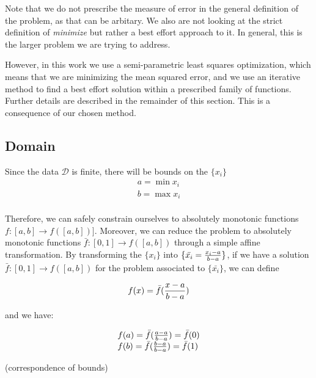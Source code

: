\documentclass[12pt,a4paper]{article}
\begin{document}
Note that we do not prescribe the measure of error in the general definition of the problem, as that can be arbitary. We also are not looking at the strict definition of {\emph{minimize}} but rather a best effort approach to it. In general, this is the larger problem we are trying to address.

However, in this work we use a semi-parametric least squares optimization, which means that we are minimizing the mean squared error, and we use an iterative method to find a best effort solution within a prescribed family of functions. Further details are described in the remainder of this section. This is a consequence of our chosen method.

\subsection{Domain}

Since the data $\mathcal{D}$ is finite, there will be bounds on the $\{x_i\}$
\begin{equation}
\begin{array}{l}
a = \min x_i\\
b = \max x_i\\
\end{array}
\end{equation}

Therefore, we can safely constrain ourselves to absolutely monotonic functions $f: [a,b] \rightarrow f([a, b])]$. Moreover, we can reduce the problem to absolutely monotonic functions $\bar{f}: [0,1] \rightarrow f([a,b])$ through a simple affine transformation. By transforming the $\{x_i\}$ into $\{\bar{x_i} = {{x_i - a} \over {b - a}}\}$, if we have a solution $\bar{f}: [0,1] \rightarrow f([a,b])$ for the problem associated to $\{\bar{x_i}\}$, we can define

\begin{equation}
f(x) = \bar{f}({{x - a} \over {b - a}})
\end{equation}

\noindent and we have:

\begin{equation}
\begin{array}{l}
f(a) = \bar{f}({{a-a} \over {b-a}}) = \bar{f}(0)\\
f(b) = \bar{f}({{b-a} \over {b-a}}) = \bar{f}(1)\\
\end{array}
\end{equation}

\noindent (correspondence of bounds)
\end{document}
